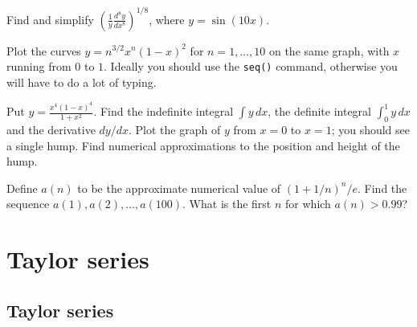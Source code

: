 \documentclass[a4paper,10pt]{amsbook}
\numberwithin{example}{chapter}
\begin{document}
\begin{exercise}
 Find and simplify $\displaystyle
 \left(\frac{1}{y}\frac{d^8y}{dx^8}\right)^{1/8}$, where
 $y=\sin(10x)$. 
\end{exercise}


\begin{exercise}
 Plot the curves $y=n^{3/2}x^n(1-x)^2$ for $n=1,\dotsc,10$ on the same
 graph, with $x$ running from $0$ to $1$.  Ideally you should use the
 \verb~seq()~ command, otherwise you will have to do a lot of typing.
\end{exercise}

\begin{exercise}
 Put $\displaystyle y=\frac{x^4(1-x)^4}{1+x^2}$.  Find the
 indefinite integral $\int y\,dx$, the definite integral
 $\int_0^1 y\,dx$ and the derivative $dy/dx$.  Plot the
 graph of $y$ from $x=0$ to $x=1$; you should see a single
 hump.  Find numerical approximations to the position and
 height of the hump.
\end{exercise}

\begin{exercise}
 Define $a(n)$ to be the approximate numerical value of
 $(1+1/n)^n/e$.  Find the sequence
 $a(1),a(2),\dotsc,a(100)$.  What is the first $n$ for which
 $a(n)>0.99$? 
\end{exercise}

\chapter{Taylor series}

\section{Taylor series}\label{sec-taylor}
\end{document}

